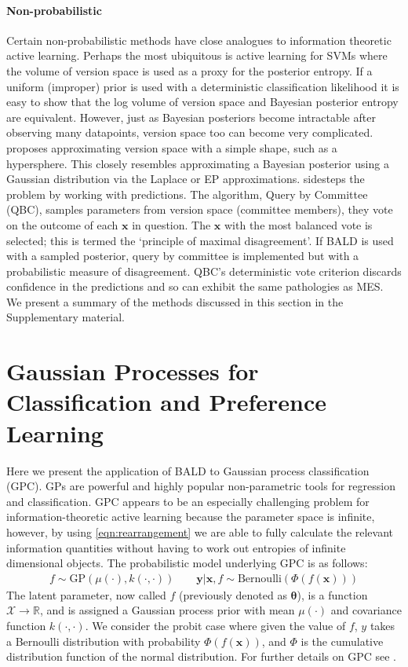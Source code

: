 \documentclass{article}
\newcommand{\x}{\bm{x}}
\newcommand{\y}{\bm{y}}
\newcommand{\param}{\bm{\theta}}
\newcommand{\ourmethod}{BALD } %
\begin{document}
\paragraph{Non-probabilistic} Certain non-probabilistic methods have close analogues to information theoretic active learning. Perhaps the most ubiquitous is active learning for SVMs \cite{tong2001,seung1992} where the volume of version space is used as a proxy for the posterior entropy. If a uniform (improper) prior is used with a deterministic classification likelihood it is easy to show that the log volume of version space and Bayesian posterior entropy are equivalent. However, just as Bayesian posteriors become intractable after observing many datapoints, version space too can become very complicated. \cite{tong2001} proposes approximating version space with a simple shape, such as a hypersphere. This closely resembles approximating a Bayesian posterior using a Gaussian distribution via the Laplace or EP approximations. \cite{seung1992} sidesteps the problem by working with predictions. The algorithm, Query by Committee (QBC), samples parameters from version space (committee members), they vote on the outcome of each $\x$ in question. The $\x$ with the most balanced vote is selected; this is termed the `principle of maximal disagreement'. If \ourmethod is used with a sampled posterior, query by committee is implemented but with a probabilistic measure of disagreement. QBC's deterministic vote criterion discards confidence in the predictions and so can exhibit the same pathologies as MES. We present a summary of the methods discussed in this section in the Supplementary material.

\section{Gaussian Processes for Classification and Preference Learning\label{sec:GPC}}

Here we present the application of \ourmethod to Gaussian process classification (GPC). GPs are powerful and highly popular non-parametric tools for regression and classification. GPC appears to be an especially challenging problem for information-theoretic active learning because the parameter space is infinite, however, by using \eqref{eqn:rearrangement} we are able to fully calculate the relevant information quantities without having to work out entropies of infinite dimensional objects. The probabilistic model underlying GPC is as follows:
\begin{align}
	f \sim \mathrm{GP}(\mu(\cdot),k(\cdot,\cdot)) \qquad \y\vert\x,f \sim\mathrm{Bernoulli}(\Phi(f(\x))) 
\end{align}
The latent parameter, now called $f$ (previously denoted as $\param$), is a function $\mathcal{X}\rightarrow\mathbb{R}$, and is assigned a Gaussian process prior with mean $\mu(\cdot)$ and covariance function $k(\cdot,\cdot)$. We consider the probit case where given the value of $f$, $y$ takes a Bernoulli distribution with probability $\Phi(f(\x))$, and $\Phi$ is the cumulative distribution function of the normal distribution. For further details on GPC see \cite{Rasmussen2006}.
\end{document}
